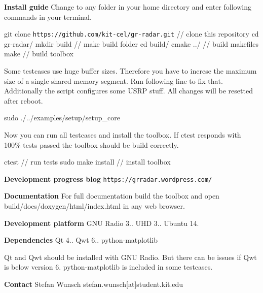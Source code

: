{\bfseries Install guide} Change to any folder in your home directory and enter following commands in your terminal.

{\ttfamily git clone {\tt https\+://github.\+com/kit-\/cel/gr-\/radar.\+git}} // clone this repository {\ttfamily cd gr-\/radar/} {\ttfamily mkdir build} // make build folder {\ttfamily cd build/} {\ttfamily cmake ../} // build makefiles {\ttfamily make} // build toolbox

Some testcases use huge buffer sizes. Therefore you have to increse the maximum size of a single shared memory segment. Run following line to fix that. Additionally the script configures some U\+S\+RP stuff. All changes will be resetted after reboot.

{\ttfamily sudo ./../examples/setup/setup\+\_\+core}

Now you can run all testcases and install the toolbox. If {\ttfamily ctest} responds with \textquotesingle{}100\% tests passed\textquotesingle{} the toolbox should be build correctly.

{\ttfamily ctest} // run tests {\ttfamily sudo make install} // install toolbox

{\bfseries Development progress blog} {\tt https\+://grradar.\+wordpress.\+com/}

{\bfseries Documentation} For full documentation build the toolbox and open {\ttfamily build/docs/doxygen/html/index.\+html} in any web browser.

{\bfseries Development platform} G\+NU Radio 3.. U\+HD 3.. Ubuntu 14.

{\bfseries Dependencies} Qt 4.. Qwt 6.. python-\/matplotlib

Qt and Qwt should be installed with G\+NU Radio. But there can be issues if Qwt is below version 6. python-\/matplotlib is included in some testcases.

{\bfseries Contact} Stefan Wunsch stefan.\+wunsch[at]student.\+kit.\+edu 